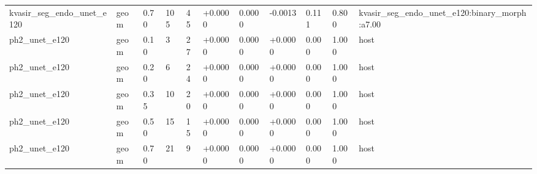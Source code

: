 \begin{table}[t]
\begin{tabular}{lllllllllll}
kvasir\_seg\_endo\_unet\_e120 & geom & 0.70 & 105 & 45 & +0.0000 & 0.0000 & -0.0013 & 0.111 & 0.800 & kvasir\_seg\_endo\_unet\_e120:binary\_morph:a7.00 \\
ph2\_unet\_e120 & geom & 0.10 & 3 & 27 & +0.0000 & 0.0000 & +0.0000 & 0.000 & 1.000 & host \\
ph2\_unet\_e120 & geom & 0.20 & 6 & 24 & +0.0000 & 0.0000 & +0.0000 & 0.000 & 1.000 & host \\
ph2\_unet\_e120 & geom & 0.35 & 10 & 20 & +0.0000 & 0.0000 & +0.0000 & 0.000 & 1.000 & host \\
ph2\_unet\_e120 & geom & 0.50 & 15 & 15 & +0.0000 & 0.0000 & +0.0000 & 0.000 & 1.000 & host \\
ph2\_unet\_e120 & geom & 0.70 & 21 & 9 & +0.0000 & 0.0000 & +0.0000 & 0.000 & 1.000 & host \\
\bottomrule
\end{tabular}
\end{table}
